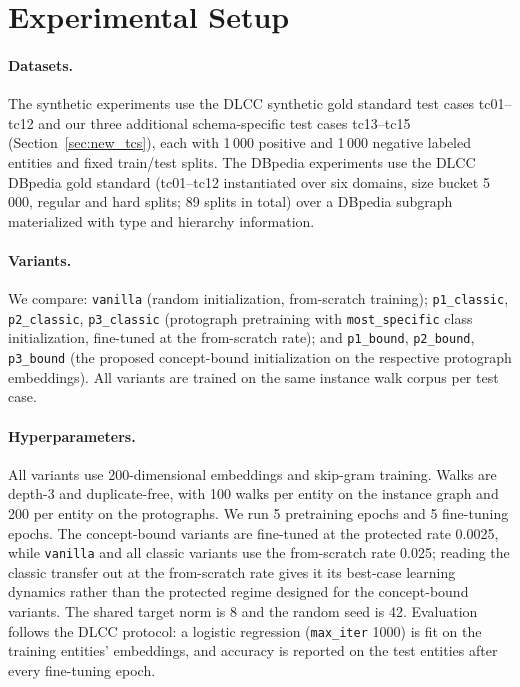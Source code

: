 \documentclass[a4paper,oneside,bibliography=totoc]{scrbook}
\begin{document}
\section{Experimental Setup}
\label{sec:setup}

\paragraph{Datasets.} The synthetic experiments use the DLCC synthetic gold
standard test cases tc01--tc12 \cite{portisch_dlcc_2022} and our three
additional schema-specific test cases tc13--tc15
(Section~\ref{sec:new_tcs}), each with 1\,000 positive and 1\,000 negative
labeled entities and fixed train/test splits. The DBpedia experiments use the
DLCC DBpedia gold standard (tc01--tc12 instantiated over six domains, size
bucket 5\,000, regular and hard splits; 89 splits in total) over a DBpedia
subgraph materialized with type and hierarchy information.

\paragraph{Variants.} We compare: \texttt{vanilla} (random initialization,
from-scratch training); \texttt{p1\_classic}, \texttt{p2\_classic},
\texttt{p3\_classic} (protograph pretraining with \texttt{most\_specific} class
initialization, fine-tuned at the from-scratch rate); and \texttt{p1\_bound}, \texttt{p2\_bound},
\texttt{p3\_bound} (the proposed concept-bound initialization on the
respective protograph embeddings). All variants are trained on the same instance
walk corpus per test case.

\paragraph{Hyperparameters.} All variants use 200-dimensional embeddings and
skip-gram training. Walks are depth-3 and duplicate-free, with 100 walks per
entity on the instance graph and 200 per entity on the protographs. We run 5
pretraining epochs and 5 fine-tuning epochs. The concept-bound variants are
fine-tuned at the protected rate 0.0025, while \texttt{vanilla} and all classic
variants use the from-scratch rate 0.025; reading the classic transfer out at
the from-scratch rate gives it its best-case learning dynamics rather than the
protected regime designed for the concept-bound variants. The shared target norm
is 8 and the random seed is 42. Evaluation follows the DLCC protocol: a logistic
regression (\texttt{max\_iter} 1000) is fit on the training entities'
embeddings, and accuracy is reported on the test entities after every
fine-tuning epoch.
\end{document}
